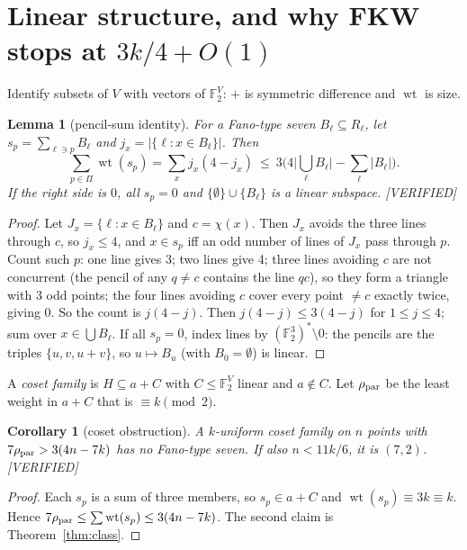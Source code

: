 \documentclass[11pt]{article}
\newtheorem{lemma}[theorem]{Lemma}
\newtheorem{corollary}[theorem]{Corollary}
\theoremstyle{definition}
\newcommand{\st}[1]{\textsf{\small[#1]}}
\newcommand{\F}{\mathbb{F}_2}
\newcommand{\wt}{\operatorname{wt}}
\begin{document}
\section{Linear structure, and why FKW stops at \texorpdfstring{$3k/4+O(1)$}{3k/4+O(1)}}\label{sec:linear}

Identify subsets of $V$ with vectors of $\F^V$: $+$ is symmetric difference and $\wt$ is size.

\begin{lemma}[pencil-sum identity]\label{lem:pencil}
For a Fano-type seven $B_\ell\subseteq R_\ell$, let $s_p=\sum_{\ell\ni p}B_\ell$ and $j_x=|\{\ell:x\in B_\ell\}|$. Then
\[
\sum_{p\in\Pi}\wt(s_p)=\sum_{x}j_x(4-j_x)\ \le\ 3\Big(4\big|\textstyle\bigcup_\ell B_\ell\big|-\sum_\ell|B_\ell|\Big).
\]
If the right side is $0$, all $s_p=0$ and $\{\emptyset\}\cup\{B_\ell\}$ is a linear subspace. \st{VERIFIED}
\end{lemma}
\begin{proof}
Let $J_x=\{\ell:x\in B_\ell\}$ and $c=\chi(x)$. Then $J_x$ avoids the three lines through $c$, so $j_x\le4$, and $x\in
s_p$ iff an odd number of lines of $J_x$ pass through $p$. Count such $p$: one line gives 3; two lines give 4; three
lines avoiding $c$ are not concurrent (the pencil of any $q\ne c$ contains the line $qc$), so they form a triangle with 3 odd
points; the four lines avoiding $c$ cover every point $\ne c$ exactly twice, giving 0. So the count is $j(4-j)$. Then
$j(4-j)\le3(4-j)$ for $1\le j\le4$; sum over $x\in\bigcup B_\ell$. If all $s_p=0$, index lines by
$(\F^3)^*\setminus0$: the pencils are the triples $\{u,v,u+v\}$, so $u\mapsto B_u$ (with $B_0=\emptyset$) is linear.
\end{proof}

A \emph{coset family} is $H\subseteq a+C$ with $C\le\F^V$ linear and $a\notin C$. Let $\rho_{\rm par}$ be the least
weight in $a+C$ that is $\equiv k\pmod2$.

\begin{corollary}[coset obstruction]\label{cor:7}
A $k$-uniform coset family on $n$ points with $7\rho_{\rm par}>3(4n-7k)$ has no Fano-type seven. If also $n<11k/6$,
it is $(7,2)$. \st{VERIFIED}
\end{corollary}
\begin{proof}
Each $s_p$ is a sum of three members, so $s_p\in a+C$ and $\wt(s_p)\equiv3k\equiv k$. Hence $7\rho_{\rm par}\le
\sum\wt(s_p)\le3(4n-7k)$. The second claim is Theorem~\ref{thm:class}.
\end{proof}
\end{document}
